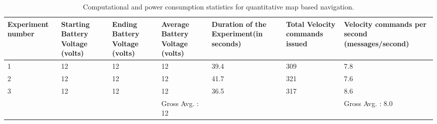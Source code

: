 \newpage

\begin{table}[h!]
	\begin{adjustwidth}{-1cm}{}
	\begin{tabular}{|p{2cm}|p{2cm}|p{2cm}|p{2.5cm}|p{2cm}|p{2cm}|p{2.5cm}|}
		\hline
		Experiment number & Starting Battery Voltage (volts) & Ending Battery Voltage (volts) & Average Battery Voltage (volts) & Duration of the Experiment(in seconds) & Total Velocity commands issued & Velocity commands per second (messages/second) \\ \hline
		1 & 12 & 12 & 12 & 39.4 & 309 & 7.8 \\ \hline
		2 & 12 & 12 & 12 & 41.7 & 321 & 7.6 \\ \hline
		3 & 12 & 12 & 12 & 36.5 & 317 & 8.6 \\ \hline
		&  &  & Gross Avg. : 12 &  &  & Gross Avg. : 8.0 \\ \hline
	\end{tabular}
	\caption{Computational and power consumption statistics for quantitative map based navigation.}
	\label{map based table}
	\end{adjustwidth}
\end{table}

